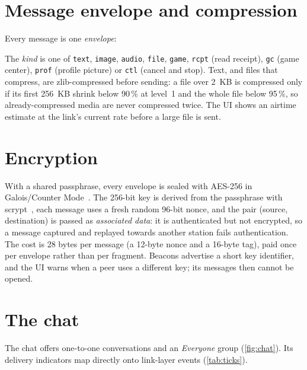 \documentclass[11pt,a4paper,oneside]{report}
\newcommand{\code}[1]{\texttt{\small #1}}
\begin{document}
\section{Message envelope and compression}
Every message is one \emph{envelope}:
\begin{center}
\end{center}
The \emph{kind} is one of \code{text}, \code{image}, \code{audio}, \code{file}, \code{game},
\code{rcpt} (read receipt), \code{gc} (game center), \code{prof} (profile picture) or \code{ctl}
(cancel and stop). Text, and files that compress, are zlib-compressed before sending: a file over
\SI{2}{KB} is compressed only if its first \SI{256}{KB} shrink below 90\,\% at level~1 and the whole file
below 95\,\%, so already-compressed media are never compressed twice. The UI shows an airtime estimate
at the link's current rate before a large file is sent.

\section{Encryption}\label{sec:crypto}
With a shared passphrase, every envelope is sealed with AES-256 in Galois/Counter Mode~\cite{gcm}. The
256-bit key is derived from the passphrase with scrypt~\cite{scrypt}, each message uses a fresh random
96-bit nonce, and the pair (source, destination) is passed as \emph{associated data}: it is
authenticated but not encrypted, so a message captured and replayed towards another station fails
authentication. The cost is 28 bytes per message (a 12-byte nonce and a 16-byte tag), paid once per
envelope rather than per fragment. Beacons advertise a short key identifier, and the UI warns when a
peer uses a different key; its messages then cannot be opened.

\section{The chat}\label{sec:chat}
The chat offers one-to-one conversations and an \emph{Everyone} group (\cref{fig:chat}). Its delivery
indicators map directly onto link-layer events (\cref{tab:ticks}).
\end{document}
